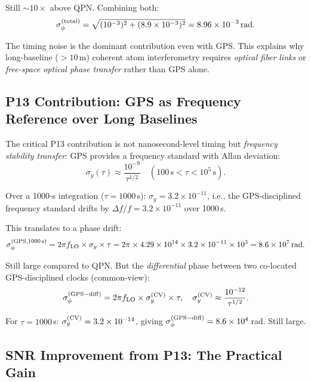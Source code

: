 \documentclass[11pt]{article}
\theoremstyle{definition}
\theoremstyle{remark}
\begin{document}
Still $\sim 10\times$ above QPN. Combining both:
\begin{equation}
\sigma_{\phi}^{(\rm total)}
= \sqrt{(10^{-3})^2 + (8.9\times10^{-3})^2}
= 8.96\times10^{-3}\,\mathrm{rad}.
\end{equation}

The timing noise is the dominant contribution even with GPS. This explains
why long-baseline ($>10$\,m) coherent atom interferometry requires
\emph{optical fiber links} or \emph{free-space optical phase transfer}
rather than GPS alone.

\subsection{P13 Contribution: GPS as Frequency Reference over Long Baselines}

The critical P13 contribution is not nanosecond-level timing but
\emph{frequency stability transfer}: GPS provides a frequency standard
with Allan deviation:
\begin{equation}
\sigma_y(\tau) \approx \frac{10^{-9}}{\tau^{1/2}} \quad (100\,\mathrm{s} < \tau < 10^5\,\mathrm{s}).
\end{equation}

Over a 1000-s integration ($\tau = 1000$\,s):
$\sigma_y = 3.2\times10^{-11}$, i.e., the GPS-disciplined frequency
standard drifts by $\Delta f/f = 3.2\times10^{-11}$ over 1000\,s.

This translates to a phase drift:
\begin{equation}
\sigma_\phi^{(\rm GPS, 1000\,s)} = 2\pi f_{\rm LO} \times \sigma_y \times \tau
= 2\pi \times 4.29\times10^{14} \times 3.2\times10^{-11} \times 10^3
= 8.6\times10^7\,\mathrm{rad}.
\end{equation}

Still large compared to QPN. But the \emph{differential} phase between two
co-located GPS-disciplined clocks (common-view):
\begin{equation}
\sigma_\phi^{(\rm GPS-diff)} = 2\pi f_{\rm LO} \times \sigma_y^{(\rm CV)} \times \tau,
\quad \sigma_y^{(\rm CV)} \approx \frac{10^{-12}}{\tau^{1/2}}.
\end{equation}

For $\tau = 1000$\,s: $\sigma_y^{(\rm CV)} = 3.2\times10^{-14}$, giving
$\sigma_\phi^{(\rm GPS-diff)} = 8.6\times10^4$\,rad. Still large.

\subsection{SNR Improvement from P13: The Practical Gain}
\end{document}
